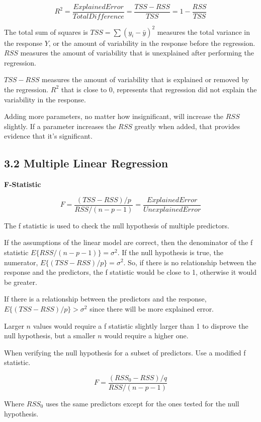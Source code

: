 \documentclass[
]{article}
\begin{document}
\[R^2 = \frac{Explained Error}{Total Difference}=\frac{TSS-RSS}{TSS} = 1 - \frac{RSS}{TSS}\]

The total sum of squares is \(TSS = \sum(y_i-\bar{y})^2\) measures the
total variance in the response \(Y\), or the amount of variability in
the response before the regression. \(RSS\) measures the amount of
variability that is unexplained after performing the regression.

\(TSS-RSS\) measures the amount of variability that is explained or
removed by the regression. \(R^2\) that is close to \(0\), represents
that regression did not explain the variability in the response.

Adding more parameters, no matter how insignificant, will increase the
\(RSS\) slightly. If a parameter increases the \(RSS\) greatly when
added, that provides evidence that it's significant.

\hypertarget{header-n40}{%
\subsection{3.2 Multiple Linear Regression}\label{header-n40}}

\textbf{F-Statistic}

\[F = \frac{(TSS-RSS)/p}{RSS/(n-p-1)} = \frac{Explained Error}{Unexplained Error}\]

The f statistic is used to check the null hypothesis of multiple
predictors.

If the assumptions of the linear model are correct, then the denominator
of the f statistic \(E\{RSS/(n-p-1)\} = \sigma^2\). If the null
hypothesis is true, the numerator, \(E\{(TSS-RSS)/p\} = \sigma^2\). So,
if there is no relationship between the response and the predictors, the
f statistic would be close to 1, otherwise it would be greater.

If there is a relationship between the predictors and the response,
\(E\{(TSS-RSS)/p\} > \sigma^2\) since there will be more explained
error.

Larger \(n\) values would require a f statistic slightly larger than 1
to disprove the null hypothesis, but a smaller \(n\) would require a
higher one.

When verifying the null hypothesis for a subset of predictors. Use a
modified f statistic.

\[F = \frac{(RSS_0 -RSS)/q}{RSS/(n-p-1)}\]

Where \(RSS_0\) uses the same predictors except for the ones tested for
the null hypothesis.
\end{document}
